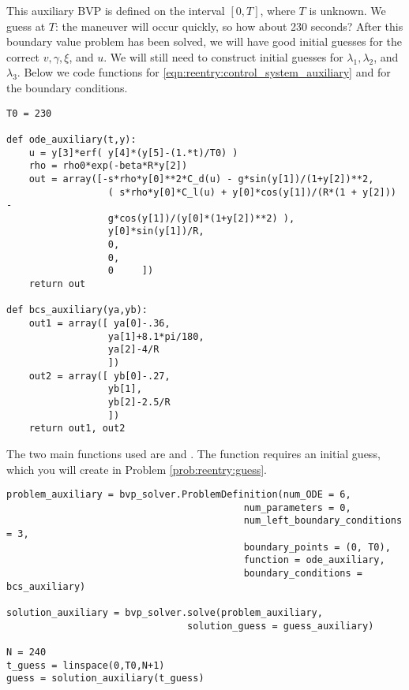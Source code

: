 This auxiliary BVP is defined on the interval $[0,T]$, where $T$ is unknown. 
We guess at $T$: the maneuver will occur quickly, so how about 230 seconds?  After this boundary value problem has been solved, we will have good initial guesses for the correct $v,\gamma,\xi$, and $u.$ We will still need to construct initial guesses for $\lambda_1, \lambda_2$, and $\lambda_3$.
Below we code  functions for \eqref{eqn:reentry:control_system_auxiliary} and for the boundary conditions. 
\begin{lstlisting}
T0 = 230	
	
def ode_auxiliary(t,y):
	u = y[3]*erf( y[4]*(y[5]-(1.*t)/T0) )
	rho = rho0*exp(-beta*R*y[2])
	out = array([-s*rho*y[0]**2*C_d(u) - g*sin(y[1])/(1+y[2])**2,
				  ( s*rho*y[0]*C_l(u) + y[0]*cos(y[1])/(R*(1 + y[2])) -
				  g*cos(y[1])/(y[0]*(1+y[2])**2) ),
				  y[0]*sin(y[1])/R,
				  0,
				  0,
				  0		])
	return out

def bcs_auxiliary(ya,yb):
	out1 = array([ ya[0]-.36,
				  ya[1]+8.1*pi/180,
				  ya[2]-4/R
				  ])
	out2 = array([ yb[0]-.27,
				  yb[1],
				  yb[2]-2.5/R
				  ])
	return out1, out2
\end{lstlisting}

The two main functions used are  and .
The function  requires an initial guess, which you will create in Problem \ref{prob:reentry:guess}. 

%
%
%
%
%

\begin{lstlisting}
problem_auxiliary = bvp_solver.ProblemDefinition(num_ODE = 6,
										  num_parameters = 0,
										  num_left_boundary_conditions = 3,
										  boundary_points = (0, T0),
										  function = ode_auxiliary,
										  boundary_conditions = bcs_auxiliary)

solution_auxiliary = bvp_solver.solve(problem_auxiliary,
								solution_guess = guess_auxiliary)

N = 240
t_guess = linspace(0,T0,N+1)
guess = solution_auxiliary(t_guess)
\end{lstlisting}







